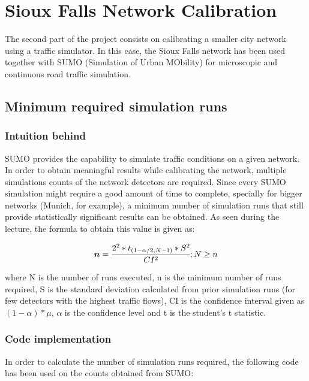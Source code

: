 
\chapter{Sioux Falls Network Calibration}\label{chapter:sioux_falls_network_calibration}
The second part of the project consists on calibrating a smaller city network using a traffic simulator. In this case, the Sioux Falls network has been used together with SUMO (Simulation of Urban MObility) for microscopic and continuous road traffic simulation.

\section{Minimum required simulation runs}
\subsection{Intuition behind}
SUMO provides the capability to simulate traffic conditions on a given network. In order to obtain meaningful results while calibrating the network, multiple simulations counts of the network detectors are required. Since every SUMO simulation might require a good amount of time to complete, specially for bigger networks (Munich, for example), a minimum number of simulation runs that still provide statistically significant results can be obtained. As seen during the lecture, the formula to obtain this value is given as:

\begin{equation}
  \boldsymbol{n} = \cfrac{2^2 * t_{(1-\alpha/2, N - 1)} * S^2}{CI^2}; N \geq n
  \label{eq:21}
\end{equation}

where N is the number of runs executed, n is the minimum number of runs required, S is the standard deviation calculated from prior simulation runs (for few detectors with the highest traffic flows), CI is the confidence interval given as \((1 - \alpha) * \mu\), \(\alpha\) is the confidence level and t is the student's t statistic. 

\subsection{Code implementation}
In order to calculate the number of simulation runs required, the following code has been used on the counts obtained from SUMO:

